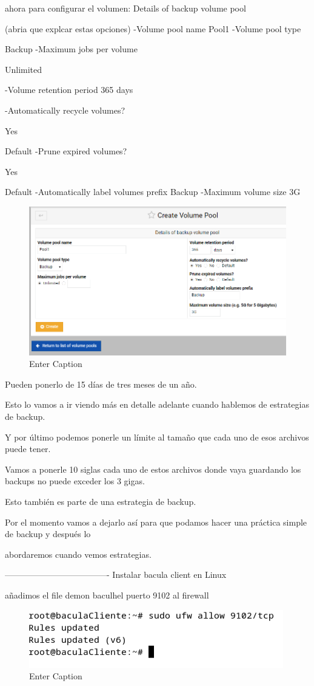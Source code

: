 ahora para  configurar el volumen:
Details of backup volume pool

(abria que explcar estas opciones)
-Volume pool name
Pool1
-Volume pool type

Backup
-Maximum jobs per volume

  Unlimited 
 
  
-Volume retention period
    365 days
    
-Automatically recycle volumes?

  Yes 
 
  Default 
-Prune expired volumes?

  Yes 
 
 
  Default 
-Automatically label volumes prefix
Backup
-Maximum volume size 
3G

\begin{figure}
    \centering
    \includegraphics[width=0.5\linewidth]{instalacionBacula/createVolumePool.png}
    \caption{Enter Caption}
\end{figure}


Pueden ponerlo de 15 días de tres meses de un año.

Esto lo vamos a ir viendo más en detalle adelante cuando hablemos de estrategias de backup.

Y por último podemos ponerle un límite al tamaño que cada uno de esos archivos puede tener.

Vamos a ponerle 10 siglas cada uno de estos archivos donde vaya guardando los backups no puede exceder los 3 gigas.

Esto también es parte de una estrategia de backup.

Por el momento vamos a dejarlo así para que podamos hacer una práctica simple de backup y después lo

abordaremos cuando vemos estrategias.

------------------------------------- 
Instalar bacula client en Linux

añadimos el file demon baculhel puerto 9102 al firewall 
\begin{figure} [H]
    \centering
    \includegraphics[width=0.5\linewidth]{instalacionBacula/9102alfirewall.png}
    \caption{Enter Caption}
\end{figure}


